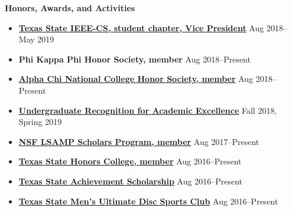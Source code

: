 \documentclass[10pt]{article}
\newlength{\headingborderwidth}
\newcommand{\resheading}[1]{
    \begin{mdframed}[
        backgroundcolor=black!15,
        linewidth=\headingborderwidth,
        innertopmargin=4pt,
        innerbottommargin=4pt,
        skipabove=6pt,
        skipbelow=2pt]
        \textbf{\large #1}
    \end{mdframed}
}
\newcommand{\resdateitem}[2]{
	\item \textbf{#1} \hfill #2 \\
}
\newenvironment{resitemize}{
    \vspace{-6pt}
    \begin{itemize}
    \setlength\itemsep{-2pt}
}{
    \end{itemize}
}
\begin{document}
\begin{NoHyper}
    
    
    

%   
%

\resheading{Honors, Awards, and Activities}

\begin{resitemize}
    \resdateitem{\href{https://www.facebook.com/TXST.IEEE/}{Texas State IEEE-CS, student chapter, Vice President}}{Aug 2018--May 2019}
    \resdateitem{Phi Kappa Phi Honor Society, member}{Aug 2018--Present}
    \resdateitem{\href{https://ims.alphachihonor.org/}{Alpha Chi National College Honor Society, member}}{Aug 2018--Present}
    \resdateitem{\href{http://www.math.txstate.edu/about/archive/2017-18/awards-day.html}{Undergraduate Recognition for Academic Excellence}}{Fall 2018, Spring 2019}
    \resdateitem{\href{http://hlsamp.cose.txstate.edu/}{NSF LSAMP Scholars Program, member}}{Aug 2017--Present}
    \resdateitem{\href{http://www.txstate.edu/honors/}{Texas State Honors College, member}}{Aug 2016--Present}
    \resdateitem{\href{http://www.finaid.txstate.edu/scholarships/freshman/assured.html}{Texas State Achievement Scholarship}}{Aug 2016--Present}
    \resdateitem{\href{http://www.campusrecreation.txstate.edu/sport-clubs/club-pages/Ultimate-Disc.html}{Texas State Men's Ultimate Disc Sports Club}}{Aug 2016--Present}


\end{resitemize}
\end{NoHyper}
\end{document}
